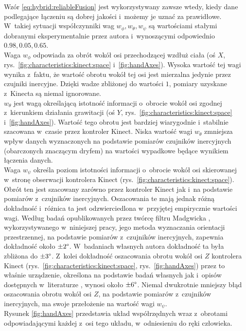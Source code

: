 Wzór \ref{eq:hybrid:reliableFusion} jest wykorzystywany zawsze wtedy, kiedy dane podlegające łączeniu są dobrej jakości i~możemy je uznać za prawidłowe. W~takiej sytuacji współczynniki wag $w_\phi , w_\theta , w_\psi$ są wartościami stałymi dobranymi eksperymentalnie przez autora i~wynoszącymi odpowiednio $0.98,0.05,0.65$.\\
Waga $w_\phi$ odpowiada za obrót wokół osi przechodzącej wzdłuż ciała (oś $X$, rys.~\ref{fig:characteristics:kinect:space} i~\ref{fig:handAxes}). Wysoka wartość tej wagi wynika z~faktu, że wartość obrotu wokół tej osi jest mierzalna jedynie przez czujniki inercyjne. Dzięki wadze zbliżonej do wartości $1$, pomiary uzyskane z~Kinecta są niemal ignorowane.\\
$w_\theta$ jest wagą określającą istotność informacji o~obrocie wokół osi zgodnej z~kierunkiem działania grawitacji (oś $Y$, rys.~\ref{fig:characteristics:kinect:space} i~\ref{fig:handAxes}). Wartość tego obrotu jest bardziej wiarygodnie i~stabilnie szacowana w~czasie przez kontroler Kinect. Niska wartość wagi $w_\theta$ zmniejsza wpływ danych wyznaczonych na podstawie pomiarów czujników inercyjnych (obarczonych znaczącym dryfem) na wartości wypadkowe będące wynikiem łączenia danych.\\ 
Waga $w_\psi$ określa poziom istotności informacji o~obrocie wokół osi skierowanej w~stronę obserwacji kontrolera Kinect (rys.~\ref{fig:characteristics:kinect:space}). Obrót ten jest szacowany zarówno przez kontroler Kinect jak i~na podstawie pomiarów z~czujników inercyjnych. Oszacowania te mają jednak różną dokładność i~różnica ta jest odzwierciedlona w~przyjętej empirycznie wartości wagi. Według badań opublikowanych przez twórcę filtru Madgwicka \cite{Madgwick2010}, wykorzystywanego w~niniejszej pracy, jego metoda wyznaczania orientacji przestrzennej, na podstawie pomiarów z~czujników inercyjnych, zapewnia dokładność około $\pm2\degree$. W~badaniach własnych autora dokładność ta była zbliżona do $\pm3\degree$. Z~kolei dokładność oszacowania obrotu wokół osi $Z$ kontrolera Kinect (rys.~\ref{fig:characteristics:kinect:space}, rys.~\ref{fig:handAxes}) przez to właśnie urządzenie, określona na podstawie badań własnych jak i~opisów dostępnych w~literaturze \cite{Huber2015}, wynosi około $\pm6\degree$. Niemal dwukrotnie mniejszy błąd oszacowania obrotu wokół osi $Z$, na podstawie pomiarów z~czujników inercyjnych, ma swoje przełożenie na wartość wagi $w_\psi$.\\
Rysunek \ref{fig:handAxes} przedstawia układ współrzędnych wraz z~obrotami odpowiadającymi każdej z~osi tego układu, w~odniesieniu do ręki człowieka.
										
